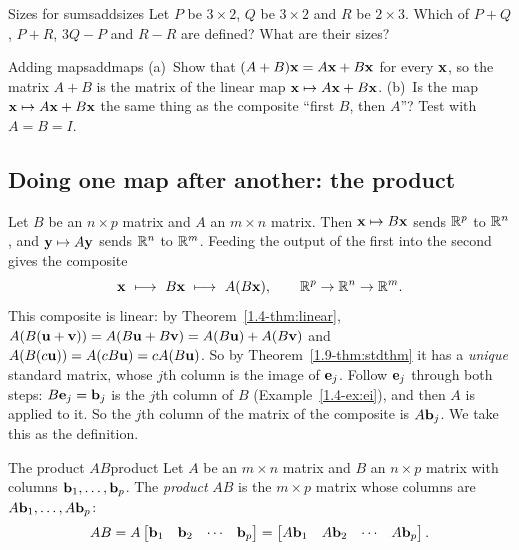 \documentclass[11pt]{article}
\begin{document}
\begin{kc}{Sizes for sums}{addsizes}
Let $P$ be $3\times2$, $Q$ be $3\times2$ and $R$ be $2\times3$. Which of $P+Q$, $P+R$, $3Q-P$ and $R-R$ are defined? What are their sizes?
\end{kc}

\begin{think}{Adding maps}{addmaps}
(a)~Show that $(A+B)\mathbf{x}=A\mathbf{x}+B\mathbf{x}$ for every $\mathbf{x}$, so the matrix $A+B$ is the matrix of the linear map $\mathbf{x}\mapsto A\mathbf{x}+B\mathbf{x}$. (b)~Is the map $\mathbf{x}\mapsto A\mathbf{x}+B\mathbf{x}$ the same thing as the composite ``first $B$, then $A$''? Test with $A=B=I$.
\end{think}

\subsection*{Doing one map after another: the product}

Let $B$ be an $n\times p$ matrix and $A$ an $m\times n$ matrix. Then $\mathbf{x}\mapsto B\mathbf{x}$ sends $\mathbb{R}^p$ to $\mathbb{R}^n$, and $\mathbf{y}\mapsto A\mathbf{y}$ sends $\mathbb{R}^n$ to $\mathbb{R}^m$. Feeding the output of the first into the second gives the composite
\[
\bv{x}\ \longmapsto\ B\bv{x}\ \longmapsto\ A(B\bv{x}),\qquad \R^p\to\R^n\to\R^m .
\]
This composite is linear: by Theorem~\ref{1.4-thm:linear}, $A(B(\mathbf{u}+\mathbf{v}))=A(B\mathbf{u}+B\mathbf{v})=A(B\mathbf{u})+A(B\mathbf{v})$ and $A(B(c\mathbf{u}))=A(cB\mathbf{u})=cA(B\mathbf{u})$. So by Theorem~\ref{1.9-thm:stdthm} it has a \emph{unique} standard matrix, whose $j$th column is the image of $\mathbf{e}_j$. Follow $\mathbf{e}_j$ through both steps: $B\mathbf{e}_j=\mathbf{b}_j$ is the $j$th column of $B$ (Example~\ref{1.4-ex:ei}), and then $A$ is applied to it. So the $j$th column of the matrix of the composite is $A\mathbf{b}_j$. We take this as the definition.

\begin{defn}{The product $AB$}{product}
Let $A$ be an $m\times n$ matrix and $B$ an $n\times p$ matrix with columns $\mathbf{b}_1,\dots,\mathbf{b}_p$. The \emph{product} $AB$ is the $m\times p$ matrix whose columns are $A\mathbf{b}_1,\dots,A\mathbf{b}_p$:
\[
AB=A\begin{bmatrix}\mathbf{b}_1&\mathbf{b}_2&\cdots&\mathbf{b}_p\end{bmatrix}=\begin{bmatrix}A\mathbf{b}_1&A\mathbf{b}_2&\cdots&A\mathbf{b}_p\end{bmatrix}.
\]
\end{defn}
\end{document}

